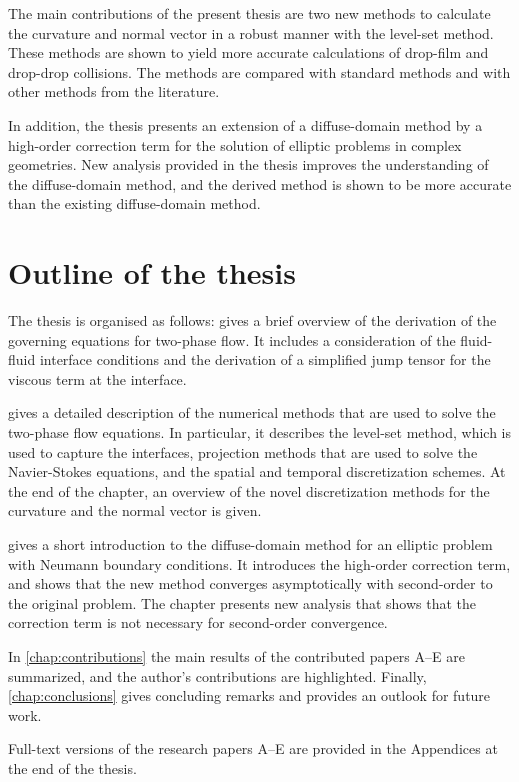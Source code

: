 \documentclass[11pt,b5paper,DIV=calc,BCOR1.3cm,headings=small,%
               footinclude=false,headsepline]{scrbook}
\begin{document}
The main contributions of the present thesis are two new methods to calculate
the curvature and normal vector in a robust manner with the level-set method.
These methods are shown to yield more accurate calculations of drop-film and
drop-drop collisions.  The methods are compared with standard methods and with
other methods from the literature.

In addition, the thesis presents an extension of a diffuse-domain method by
a high-order correction term for the solution of elliptic problems in complex
geometries.  New analysis provided in the thesis improves the understanding of
the diffuse-domain method, and the derived method is shown to be more accurate
than the existing diffuse-domain method.

\section{Outline of the thesis}
The thesis is organised as follows:  gives a brief
overview of the derivation of the governing equations for two-phase flow.  It
includes a consideration of the fluid-fluid interface conditions and the
derivation of a simplified jump tensor for the viscous term at the interface.

 gives a detailed description of the numerical
methods that are used to solve the two-phase flow equations.  In particular, it
describes the level-set method, which is used to capture the interfaces,
projection methods that are used to solve the Navier-Stokes equations, and the
spatial and temporal discretization schemes.  At the end of the chapter, an
overview of the novel discretization methods for the curvature and the normal
vector is given.

 gives a short introduction to the diffuse-domain
method for an elliptic problem with Neumann boundary conditions.  It introduces
the high-order correction term, and shows that the new method converges
asymptotically with second-order to the original problem.  The chapter presents
new analysis that shows that the correction term is not necessary for
second-order convergence.

In \cref{chap:contributions} the main results of the contributed papers A--E
are summarized, and the author's contributions are highlighted.  Finally,
\cref{chap:conclusions} gives concluding remarks and provides an outlook for
future work.

Full-text versions of the research papers A--E are provided in the Appendices
at the end of the thesis.
\end{document}
